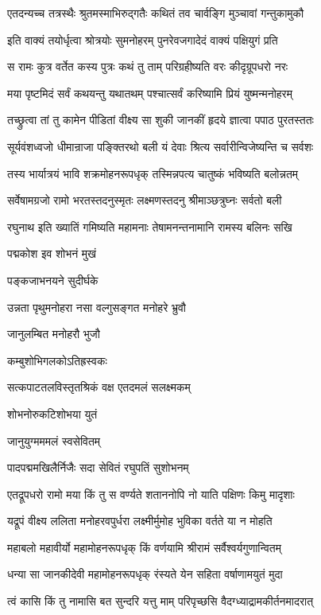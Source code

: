 \twolineshloka
{एतदन्यच्च तत्रस्थैः श्रुतमस्माभिरुद्गतैः}
{कथितं तव चार्वङ्गि मुञ्चावां गन्तुकामुकौ}%

\twolineshloka
{इति वाक्यं तयोर्धृत्वा श्रोत्रयोः सुमनोहरम्}
{पुनरेवजगादेदं वाक्यं पक्षियुगं प्रति}%

\twolineshloka
{स रामः कुत्र वर्तेत कस्य पुत्रः कथं तु ताम्}
{परिग्रहीष्यति वरः कीदृग्रूपधरो नरः}%

\twolineshloka
{मया पृष्टमिदं सर्वं कथयन्तु यथातथम्}
{पश्चात्सर्वं करिष्यामि प्रियं युष्मन्मनोहरम्}%

\twolineshloka
{तच्छ्रुत्वा तां तु कामेन पीडितां वीक्ष्य सा शुकी}
{जानकीं हृदये ज्ञात्वा पपाठ पुरतस्ततः}%

\twolineshloka
{सूर्यवंशध्वजो धीमान्राजा पङ्क्तिरथो बली}
{यं देवाः श्रित्य सर्वारीन्विजेष्यन्ति च सर्वशः}%

\twolineshloka
{तस्य भार्यात्रयं भावि शक्रमोहनरूपधृक्}
{तस्मिन्नपत्य चातुष्कं भविष्यति बलोन्नतम्}%

\twolineshloka
{सर्वेषामग्रजो रामो भरतस्तदनुस्मृतः}
{लक्ष्मणस्तदनु श्रीमाञ्छत्रुघ्नः सर्वतो बली}%

\twolineshloka
{रघुनाथ इति ख्यातिं गमिष्यति महामनाः}
{तेषामनन्तनामानि रामस्य बलिनः सखि}%

पद्मकोश इव शोभनं मुखं

पङ्कजाभनयने सुदीर्घके

\twolineshloka
{उन्नता पृथुमनोहरा नसा}
{वल्गुसङ्गत मनोहरे भ्रुवौ}%

जानुलम्बित मनोहरौ भुजौ

कम्बुशोभिगलकोऽतिह्रस्वकः

\twolineshloka
{सत्कपाटतलविस्तृतश्रिकं}
{वक्ष एतदमलं सलक्ष्मकम्}%

शोभनोरुकटिशोभया युतं

जानुयुग्मममलं स्वसेवितम्

\twolineshloka
{पादपद्ममखिलैर्निजैः सदा}
{सेवितं रघुपतिं सुशोभनम्}%

\twolineshloka
{एतद्रूपधरो रामो मया किं तु स वर्ण्यते}
{शताननोपि नो याति पक्षिणः किमु मादृशाः}%

\twolineshloka
{यद्रूपं वीक्ष्य ललिता मनोहरवपुर्धरा}
{लक्ष्मीर्मुमोह भुविका वर्तते या न मोहति}%

\twolineshloka
{महाबलो महावीर्यो महामोहनरूपधृक्}
{किं वर्णयामि श्रीरामं सर्वैश्वर्यगुणान्वितम्}%

\twolineshloka
{धन्या सा जानकीदेवी महामोहनरूपधृक्}
{रंस्यते येन सहिता वर्षाणामयुतं मुदा}%

\twolineshloka
{त्वं कासि किं तु नामासि बत सुन्दरि यत्तु माम्}
{परिपृच्छसि वैदग्ध्याद्रामकीर्तनमादरात्}%

